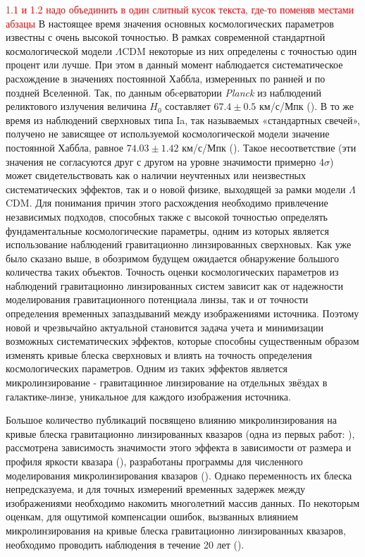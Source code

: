 \textcolor{red}{1.1 и 1.2 надо объединить в один слитный кусок текста, где-то поменяв местами абзацы}
В настоящее время значения основных космологических параметров известны с очень высокой точностью. В рамках современной стандартной космологической модели $\Lambda$CDM некоторые из них определены с точностью один процент или лучше. При этом в данный момент наблюдается систематическое расхождение в значениях постоянной Хаббла, измеренных по ранней и по поздней Вселенной. Так, по данным обcерватории \textit{Planck} из наблюдений реликтового излучения величина $H_0$ составляет $67.4 \pm 0.5$ км/с/Мпк (\cite{planck2018}). В то же время из наблюдений сверхновых типа Ia, так называемых «стандартных свечей», получено не зависящее от используемой космологической модели значение постоянной Хаббла, равное $74.03 \pm 1.42$ км/с/Мпк (\cite{riess2019}). Такое несоответствие (эти значения не согласуются друг с другом на уровне значимости примерно $4\sigma$) может свидетельствовать как о наличии неучтенных или неизвестных систематических эффектов, так и о новой физике, выходящей за рамки модели $\Lambda$CDM. Для понимания причин этого расхождения необходимо привлечение независимых подходов, способных также с высокой точностью определять фундаментальные космологические параметры, одним из которых является использование наблюдений гравитационно линзированных сверхновых. Как уже было сказано выше, в обозримом будущем ожидается обнаружение большого количества таких объектов.  Точность оценки космологических параметров из наблюдений гравитационно линзированных систем зависит как от надежности моделирования гравитационного потенциала линзы, так и от точности определения временных запаздываний между изображениями источника. Поэтому новой и чрезвычайно актуальной становится задача учета и минимизации возможных систематических эффектов, которые способны существенным образом изменять кривые блеска сверхновых и влиять на точность определения космологических параметров. Одним из таких эффектов является микролинзирование - гравитацинное линзирование на отдельных звёздах в галактике-линзе, уникальное для каждого изображения источника.  

Большое количество публикаций посвящено влиянию микролинзирования на кривые блеска гравитационно линзированных квазаров (одна из первых работ: \cite{changrefsdal1979}), рассмотрена зависимость значимости этого эффекта в зависимости от размера и профиля яркости квазара (\cite{sizeiseverything}), разработаны программы для численного моделирования микролинзирования квазаров (\cite{wambsganss1992}). Однако переменность их блеска непредсказуема, и для точных измерений временных задержек между изображениями необходимо накомить многолетний массив данных. По некоторым оценкам, для ощутимой компенсации ошибок, вызванных влиянием микролинзирования на кривые блеска гравитационно линзированных квазаров, необходимо проводить наблюдения в течение 20 лет (\cite{20years}).

